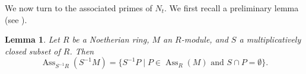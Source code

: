 \documentclass[12pt]{amsart}
\def\Ass{\operatorname{Ass}}
\newtheorem{lemma}{Lemma}[section]
\begin{document}
We now turn to the associated primes of $N_t$. We first recall a preliminary lemma (see \cite[Proposition 5, page 263]{B}).

\begin{lemma}\label{lem_ass_localization} 
Let $R$ be a Noetherian ring, $M$ an $R$-module, and $S$ a multiplicatively closed subset of $R$. Then 
$$\Ass_{S^{-1} R}(S^{-1} M) = \{ S^{-1} P \mid P \in \Ass_R(M) \text{ and } S \cap P = \emptyset \}.$$
\end{lemma}



\end{document}
